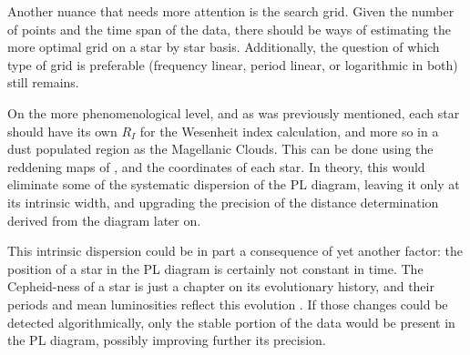 Another nuance that needs more attention is the search grid. 
Given the number of points and the time span of the data, 
there should be ways of estimating the more optimal grid on a star by star basis.
Additionally, the question of which type of grid is preferable (frequency linear, period linear, or logarithmic in both) still remains.

On the more phenomenological level, and as was previously mentioned, 
each star should have its own $R_I$ for the Wesenheit index calculation, and more so in a dust populated region as the Magellanic Clouds.
This can be done using the reddening maps of \cite{Reddening2021}, and the coordinates of each star.
In theory, this would eliminate some of the systematic dispersion of the PL diagram, leaving it only at its intrinsic width,
and upgrading the precision of the distance determination derived from the diagram later on.

This intrinsic dispersion could be in part a consequence of yet another factor: 
the position of a star in the PL diagram is certainly not constant in time.
The Cepheid-ness of a star is just a chapter on its evolutionary history,
and their periods and mean luminosities reflect this evolution \citep{Turner2006}.
If those changes could be detected algorithmically,
only the stable portion of the data would be present in the PL diagram,
possibly improving further its precision.




















